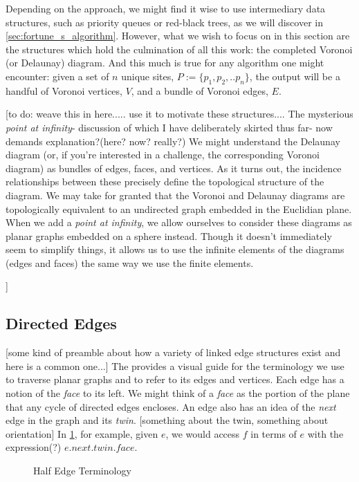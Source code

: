 \documentclass[12pt,twoside]{reedthesis}
\begin{document}
    Depending on the approach, we might find it wise to use intermediary data structures, such as priority queues or red-black trees, as we will discover in \cref{sec:fortune_s_algorithm}. However, what we wish to focus on in this section are the structures which hold the culmination of all this work: the completed Voronoi (or Delaunay) diagram. And this much is true for any algorithm one might encounter: given a set of $n$ unique sites, $P:=\{p_{1}, p_{2}, .. p_{n}\}$, the output will be a handful of Voronoi vertices, $V$, and a bundle of Voronoi edges, $E$. 

    [to do: weave this in here..... use it to motivate these structures.... The mysterious \emph{point at infinity}- discussion of which I have deliberately skirted thus far- now demands explanation?(here? now? really?) We might understand the Delaunay diagram (or, if you're interested in a challenge, the corresponding Voronoi diagram) as bundles of edges, faces, and vertices. As it turns out, the incidence relationships between these precisely define the topological structure of the diagram. We may take for granted that the Voronoi and Delaunay diagrams are topologically equivalent to an undirected graph embedded in the Euclidian plane. When we add a \emph{point at infinity}, we allow ourselves to consider these diagrams as planar graphs embedded on a sphere instead. Though it doesn't immediately seem to simplify things, it allows us to use the infinite elements of the diagrams (edges and faces) the same way we use the finite elements. \par]

    \subsection{Directed Edges}
    \label{subsec:half_edge_ds}
      [some kind of preamble about how a variety of linked edge structures exist and here is a common one...] The  provides a visual guide for the terminology we use to traverse planar graphs and to refer to its edges and vertices. Each edge has a notion of the \emph{face} to its left. We might think of a \emph{face} as the portion of the plane that any cycle of directed edges encloses. An edge also has an idea of the \emph{next} edge in the graph and its \emph{twin}. [something about the twin, something about orientation]  In \cref{fig:half_edge}, for example, given $e$, we would access $f$ in terms of $e$ with the expression(?) $e.next.twin.face$.

    \begin{figure}[!htb]
      \centering
      
      \caption{Half Edge Terminology}
      \label{fig:half_edge}
    \end{figure}
    \clearpage
\end{document}
